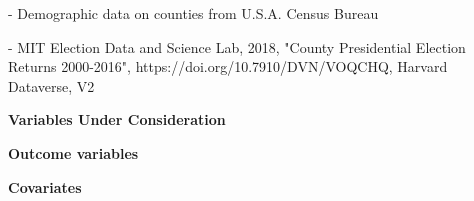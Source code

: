 \documentclass[
12pt, 
english, 
oneside,
doublespacing, %
nolistspacing, %
headsepline, %
]{../Thesis} %
\begin{document}
- Demographic data on counties from U.S.A. Census Bureau

- MIT Election Data and Science Lab, 2018, "County Presidential Election Returns 2000-2016", https://doi.org/10.7910/DVN/VOQCHQ, Harvard Dataverse, V2



\vspace{3ex}
{\bfseries\noindent\large{Variables Under Consideration}}

{\noindent\bfseries{Outcome variables}}


{\noindent\bfseries{Covariates}}
\end{document}
